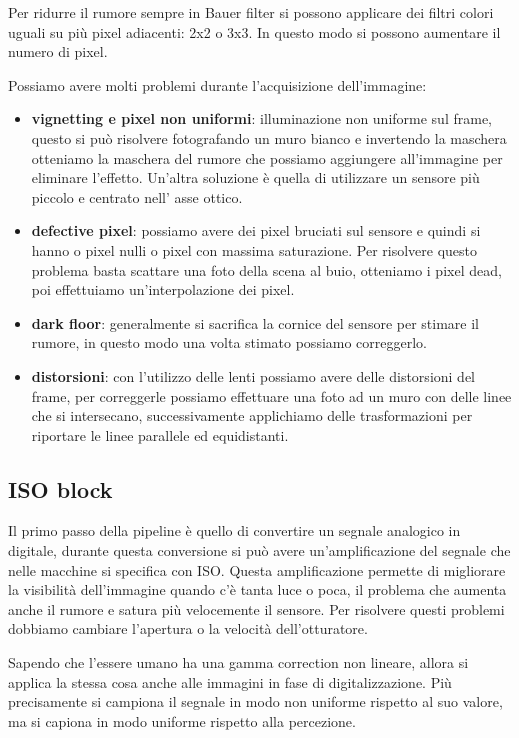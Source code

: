 Per ridurre il rumore sempre in Bauer filter si possono applicare dei filtri colori 
uguali su più pixel adiacenti: 2x2 o 3x3. In questo modo si possono aumentare il 
numero di pixel.

Possiamo avere molti problemi durante l'acquisizione dell'immagine:
\begin{itemize}
    \item \textbf{vignetting e pixel non uniformi}: illuminazione non uniforme sul frame, questo si 
    può risolvere fotografando un muro bianco e invertendo la maschera otteniamo 
    la maschera del rumore che possiamo aggiungere all'immagine per eliminare l'effetto.
    Un'altra soluzione è quella di utilizzare un sensore più piccolo e centrato nell'
    asse ottico.
    \item \textbf{defective pixel}: possiamo avere dei pixel bruciati sul sensore
    e quindi si hanno o pixel nulli o pixel con massima saturazione. Per risolvere 
    questo problema basta scattare una foto della scena al buio, otteniamo i pixel 
    dead, poi effettuiamo un'interpolazione dei pixel. 
    \item \textbf{dark floor}: generalmente si sacrifica la cornice del sensore per 
    stimare il rumore, in questo modo una volta stimato possiamo correggerlo.
    \item \textbf{distorsioni}: con l'utilizzo delle lenti possiamo avere delle
    distorsioni del frame, per correggerle possiamo effettuare una foto ad un muro 
    con delle linee che si intersecano, successivamente applichiamo delle trasformazioni
    per riportare le linee parallele ed equidistanti. 
\end{itemize}

\subsection{ISO block}
Il primo passo della pipeline è quello di convertire un segnale analogico in digitale,
durante questa conversione si può avere un'amplificazione del segnale che nelle macchine 
si specifica con ISO. Questa amplificazione permette di migliorare la visibilità
dell'immagine quando c'è tanta luce o poca, il problema che aumenta anche il rumore
e satura più velocemente il sensore. Per risolvere questi problemi dobbiamo cambiare 
l'apertura o la velocità dell'otturatore.

Sapendo che l'essere umano ha una gamma correction non lineare, allora si applica la 
stessa cosa anche alle immagini in fase di digitalizzazione. Più precisamente si campiona 
il segnale in modo non uniforme rispetto al suo valore, ma si capiona in modo uniforme rispetto
alla percezione. 

